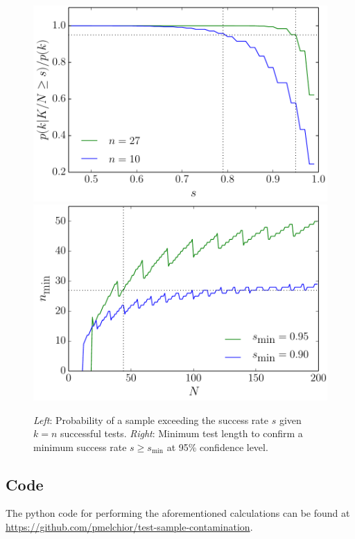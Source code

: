 \documentclass[11pt]{scrartcl}
\begin{document}
\begin{figure}
\includegraphics[width=0.5\linewidth]{probKGivenS}
\includegraphics[width=0.5\linewidth]{n_min}
\caption{\emph{Left}: Probability of a sample exceeding the success rate $s$ given $k=n$ successful tests.\newline
\emph{Right}: Minimum test length to confirm a minimum success rate $s\geq s_\textrm{min}$ at 95\% confidence level.}
\label{fig}
\end{figure}

\subsection*{Code}
The python code for performing the aforementioned calculations can be found at \url{https://github.com/pmelchior/test-sample-contamination}.
\end{document}
